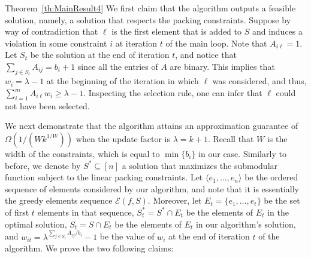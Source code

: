 \documentclass[11pt]{article}
\theoremstyle{plain}
\theoremstyle{definition}
\begin{document}
\begin{proofof}{Theorem~\ref{th:MainResult4}}
We first claim that the algorithm outputs a feasible solution,
namely, a solution that respects the packing constraints. Suppose
by way of contradiction that $\ell$ is the first element that is
added to $S$ and induces a violation in some constraint $i$ at
iteration $t$ of the main loop. Note that $A_{i \ell} = 1$. Let
$S_t$ be the solution at the end of iteration $t$, and notice that
$\sum_{j \in S_t} A_{i j} = b_i + 1$ since all the entries of $A$
are binary. This implies that $w_i = \lambda - 1$ at the beginning
of the iteration in which $\ell$ was considered, and thus,
$\sum_{i=1}^m A_{i \ell} w_i \geq \lambda - 1$. Inspecting the
selection rule, one can infer that $\ell$ could not have been
selected.

We next demonstrate that the algorithm attains an approximation
guarantee of $\Omega(1 / (Wk^{1/W}))$ when the update factor is
$\lambda = k + 1$. Recall that $W$ is the width of the
constraints, which is equal to $\min\{b_i\}$ in our case.
Similarly to before, we denote by $S^* \subseteq [n]$ a solution
that maximizes the submodular function subject to the linear
packing constraints. Let $\langle e_1, \ldots, e_n \rangle$ be the
ordered sequence of elements considered by our algorithm, and note
that it is essentially the greedy elements sequence
$\mathcal{E}(f,S)$. Moreover, let $E_t = \{e_1,\ldots,e_t\}$ be
the set of first $t$ elements in that sequence, $S^*_t = S^* \cap
E_t$ be the elements of $E_t$ in the optimal solution, $S_t = S
\cap E_t$ be the elements of $E_t$ in our algorithm's solution,
and $w_{it} = \lambda^{\sum_{j \in S_t} A_{ij} / b_i} - 1$ be the
value of $w_i$ at the end of iteration $t$ of the algorithm. We
prove the two following claims:


\end{proofof}
\end{document}
